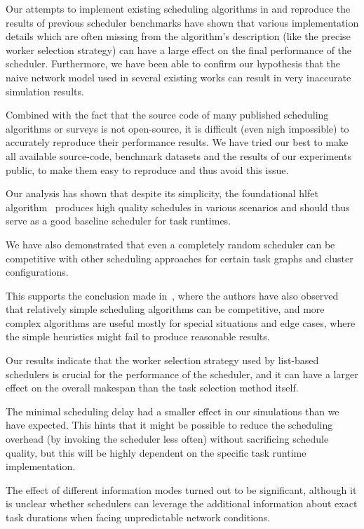 Our attempts to implement existing scheduling algorithms in \estee{} and reproduce
the results of previous scheduler benchmarks have shown that various implementation details which
are often missing from the algorithm's description (like the precise worker selection strategy) can
have a large effect on the final performance of the scheduler. Furthermore, we have been able to
confirm our hypothesis that the naive network model used in several existing works can result in
very inaccurate simulation results.

Combined with the fact that the source code of many published scheduling algorithms or surveys is
not open-source, it is difficult (even nigh impossible) to accurately reproduce their performance
results. We have tried our best to make all available source-code, benchmark datasets and the
results of our experiments public, to make them easy to reproduce and thus avoid this issue.

Our analysis has shown that despite its simplicity, the foundational \gls{hlfet}
algorithm~\cite{hlfet1974} produces high quality schedules in various scenarios and should
thus serve as a good baseline scheduler for task runtimes.

We have also demonstrated that even a completely random scheduler can be competitive with other
scheduling approaches for certain task graphs and cluster configurations.

This supports the conclusion made in~\cite{wang2018list}, where the authors have also observed
that relatively simple scheduling algorithms can be competitive, and more complex algorithms are
useful mostly for special situations and edge cases, where the simple heuristics might fail to
produce reasonable results.

Our results indicate that the worker selection strategy used by list-based schedulers is crucial
for the performance of the scheduler, and it can have a larger effect on the overall makespan than
the task selection method itself.

The minimal scheduling delay had a smaller effect in our simulations than we have expected. This
hints that it might be possible to reduce the scheduling overhead (by invoking the scheduler less
often) without sacrificing schedule quality, but this will be highly dependent on the specific task
runtime implementation.

The effect of different information modes turned out to be significant, although it is unclear
whether schedulers can leverage the additional information about exact task durations when facing
unpredictable network conditions.

